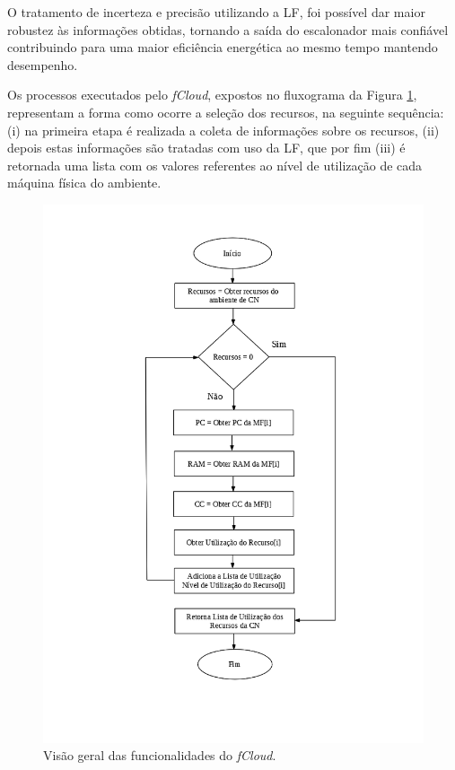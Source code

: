\documentclass[tcc,capa]{texufpel}
\begin{document}

O tratamento de incerteza e precisão utilizando a LF, foi possível dar maior robustez às informações obtidas, tornando a saída do escalonador mais confiável contribuindo para uma maior eficiência energética ao mesmo tempo mantendo desempenho.

Os processos executados pelo \emph{fCloud}, expostos no fluxograma da Figura \ref{processo_escalonamento_fuzzy}, representam a forma como ocorre a seleção dos recursos, na seguinte sequência: (i) na primeira etapa é realizada a coleta de informações sobre os recursos, (ii) depois estas informações são tratadas com uso da LF, que por fim (iii) é retornada uma lista com os valores referentes ao nível de utilização de cada máquina física do ambiente.

\newpage

\begin{figure}[h]
    \centering
    \includegraphics[scale=0.60]{images/startfigura29.png}
    \caption{Visão geral das funcionalidades do \emph{fCloud}.}
    \label{processo_escalonamento_fuzzy}
\end{figure}
\end{document}
